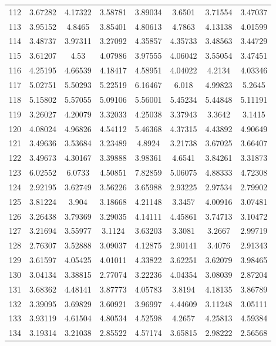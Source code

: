 \begin{center}
\begin{longtable}{cccccccc}
112 & 3.67282 & 4.17322 & 3.58781 & 3.89034 & 3.6501 & 3.71554 & 3.47037\\
113 & 3.95152 & 4.8465 & 3.85401 & 4.80613 & 4.7863 & 4.13138 & 4.01599\\
114 & 3.48737 & 3.97311 & 3.27092 & 4.35857 & 4.35733 & 3.48563 & 3.44729\\
115 & 3.61207 & 4.53 & 4.07986 & 3.97555 & 4.06042 & 3.55054 & 3.47451\\
116 & 4.25195 & 4.66539 & 4.18417 & 4.58951 & 4.04022 & 4.2134 & 4.03346\\
117 & 5.02751 & 5.50293 & 5.22519 & 6.16467 & 6.018 & 4.99823 & 5.2645\\
118 & 5.15802 & 5.57055 & 5.09106 & 5.56001 & 5.45234 & 5.44848 & 5.11191\\
119 & 3.26027 & 4.20079 & 3.32033 & 4.25038 & 3.37943 & 3.3642 & 3.1415\\
120 & 4.08024 & 4.96826 & 4.54112 & 5.46368 & 4.37315 & 4.43892 & 4.90649\\
121 & 3.49636 & 3.53684 & 3.23489 & 4.8924 & 3.21738 & 3.67025 & 3.66407\\
122 & 3.49673 & 4.30167 & 3.39888 & 3.98361 & 4.6541 & 3.84261 & 3.31873\\
123 & 6.02552 & 6.0733 & 4.50851 & 7.82859 & 5.06075 & 4.88333 & 4.72308\\
124 & 2.92195 & 3.62749 & 3.56226 & 3.65988 & 2.93225 & 2.97534 & 2.79902\\
125 & 3.81224 & 3.904 & 3.18668 & 4.21148 & 3.3457 & 4.00916 & 3.07481\\
126 & 3.26438 & 3.79369 & 3.29035 & 4.14111 & 4.45861 & 3.74713 & 3.10472\\
127 & 3.21694 & 3.55977 & 3.1124 & 3.63203 & 3.3081 & 3.2667 & 2.99719\\
128 & 2.76307 & 3.52888 & 3.09037 & 4.12875 & 2.90141 & 3.4076 & 2.91343\\
129 & 3.61597 & 4.05425 & 4.01011 & 4.33822 & 3.62251 & 3.62079 & 3.98465\\
130 & 3.04134 & 3.38815 & 2.77074 & 3.22236 & 4.04354 & 3.08039 & 2.87204\\
131 & 3.68362 & 4.48141 & 3.87773 & 4.05783 & 3.8194 & 4.18135 & 3.86789\\
132 & 3.39095 & 3.69829 & 3.60921 & 3.96997 & 4.44609 & 3.11248 & 3.05111\\
133 & 3.93119 & 4.61504 & 4.80534 & 4.52598 & 4.2657 & 4.25813 & 4.59384\\
134 & 3.19314 & 3.21038 & 2.85522 & 4.57174 & 3.65815 & 2.98222 & 2.56568\\

\end{longtable}
\end{center}
